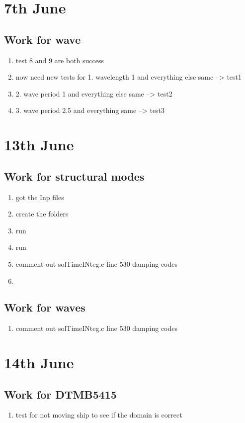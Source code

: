 \documentclass[12pt]{article} %
\begin{document}
\section{7th June}
\subsection{Work for wave}
\begin{enumerate}
    \item test 8 and 9 are both success
    \item now need new tests for 1. wavelength 1 and everything else same --> test1
    \item 2. wave period 1 and everything else same --> test2
    \item 3. wave period 2.5 and everything same --> test3
\end{enumerate}
\section{13th June}
\subsection{Work for structural modes}
\begin{enumerate}
    \item got the Inp files
    \item create the folders
    \item run %
    \item run %
    \item comment out solTimeINteg.c line 530 damping codes
    \item 
\end{enumerate}
\subsection{Work for waves}
\begin{enumerate}
\item comment out solTimeINteg.c line 530 damping codes
\end{enumerate}
\section{14th June}
\subsection{Work for DTMB5415}
\begin{enumerate}
    \item test for not moving ship to see if the domain is correct
\end{enumerate}
\end{document}
